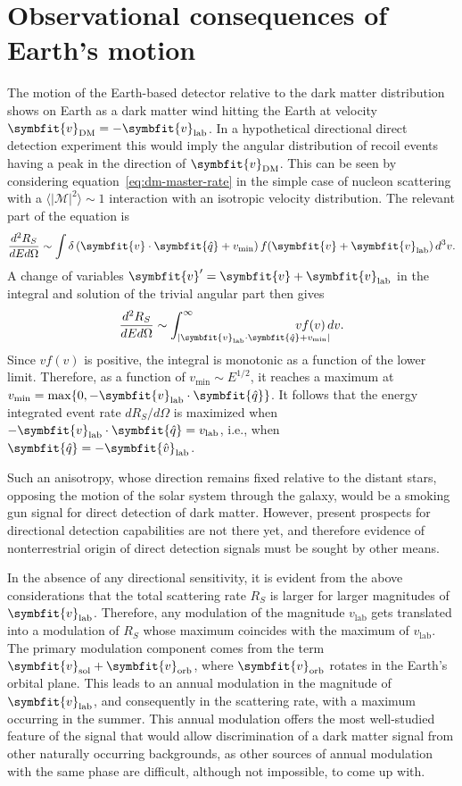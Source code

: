 \documentclass[b5paper, 10pt, twoside]{book}
\renewcommand{\vec}[1]{\symbfit{#1}}
\newcommand{\ddder}[3]{\frac{d^2#1}{d#2d#3}}
\newcommand{\unitv}[1]{\symbfit{\hat{#1}}}
\newcommand{\difd}{\,d}
\newcommand{\tmean}[1]{\langle#1\rangle}
\begin{document}
\section{Observational consequences of Earth's motion}

The motion of the Earth-based detector relative to the dark matter distribution shows on Earth as a dark matter wind hitting the Earth at velocity $\vec{v}_\text{DM}=-\vec{v}_\text{lab}$. In a hypothetical directional direct detection experiment this would imply the angular distribution of recoil events having a peak in the direction of $\vec{v}_\text{DM}$. This can be seen by considering equation~\eqref{eq:dm-master-rate} in the simple case of nucleon scattering with a $\tmean{|\mathcal{M}|^2}\sim 1$ interaction with an isotropic velocity distribution. The relevant part of the equation is
\begin{equation}
    \ddder{R_S}{E}{\Omega}\sim\int\delta\left(\vec{v}\cdot\unitv{q}+v_\text{min}\right)f(\vec{v}+\vec{v}_\text{lab})\difd^3v.
\end{equation}
A change of variables $\vec{v}'=\vec{v}+\vec{v}_\text{lab}$ in the integral and solution of the trivial angular part then gives
\begin{equation}
    \ddder{R_S}{E}{\Omega}\sim\int_{|\vec{v}_\text{lab}\cdot\unitv{q}+v_\text{min}|}^\infty\hspace{-3em}vf(v)\difd v.
    \label{eq:isotropic-rate}
\end{equation}
Since $vf(v)$ is positive, the integral is monotonic as a function of the lower limit. Therefore, as a function of $v_\text{min}\sim E^{1/2}$, it reaches a maximum at $v_\text{min}=\max\{0,-\vec{v}_\text{lab}\cdot\unitv{q}\}$. It follows that the energy integrated event rate $dR_S/d\Omega$ is maximized when $-\vec{v}_\text{lab}\cdot\unitv{q}=v_\text{lab}$, i.e., when $\unitv{q}=-\unitv{v}_\text{lab}$.

Such an anisotropy, whose direction remains fixed relative to the distant stars, opposing the motion of the solar system through the galaxy, would be a smoking gun signal for direct detection of dark matter. However, present prospects for directional detection capabilities are not there yet, and therefore evidence of nonterrestrial origin of direct detection signals must be sought by other means.

In the absence of any directional sensitivity, it is evident from the above considerations that the total scattering rate $R_S$ is larger for larger magnitudes of $\vec{v}_\text{lab}$. Therefore, any modulation of the magnitude $v_\text{lab}$ gets translated into a modulation of $R_S$ whose maximum coincides with the maximum of $v_\text{lab}$. The primary modulation component comes from the term $\vec{v}_\text{sol}+\vec{v}_\text{orb}$, where $\vec{v}_\text{orb}$ rotates in the Earth's orbital plane. This leads to an annual modulation in the magnitude of $\vec{v}_\text{lab}$, and consequently in the scattering rate, with a maximum occurring in the summer. This annual modulation offers the most well-studied feature of the signal that would allow discrimination of a dark matter signal from other naturally occurring backgrounds, as other sources of annual modulation with the same phase are difficult, although not impossible, to come up with.
\end{document}

